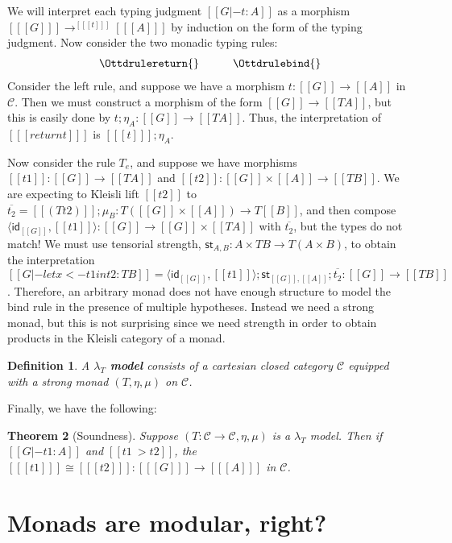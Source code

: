 \documentclass{article}
\let\mto\to
\let\to\relax
\newcommand{\to}{\rightarrow}
\newcommand{\cat}[1]{\mathcal{#1}}
\newcommand{\id}[0]{\mathsf{id}}
\newtheorem{theorem}{Theorem}
\newtheorem{definition}[theorem]{Definition}
\begin{document}
We will interpret each typing judgment $[[G |- t : A]]$ as a morphism
$[[ [G] ]] \mto^{[[ [t] ]]} [[ [A] ]]$ by induction on the form of the
typing judgment. Now consider the two monadic typing rules:
\[
\begin{array}{lll}
  \Ottdrulereturn{} & \quad & \Ottdrulebind{}
\end{array}
\]
Consider the left rule, and suppose we have a morphism $t : [[G]] \mto
[[A]]$ in $\cat{C}$.  Then we must construct a morphism of the form
$[[G]] \mto [[T A]]$, but this is easily done by $t;\eta_A : [[G]]
\mto [[T A]]$.  Thus, the interpretation of $[[ [return t] ]]$ is
$[[ [t] ]];\eta_A$.

Now consider the rule $T_e$, and suppose we have morphisms $[[t1]] :
[[G]] \mto [[T A]]$ and $[[t2]] : [[G]] \times [[A]] \mto [[T B]]$.
We are expecting to Kleisli lift $[[t2]]$ to $\overline{t_2} = [[(T
    t2)]];\mu_B : T ([[G]] \times [[A]]) \mto T [[B]]$, and then
compose $\langle \id_{[[G]]} , [[t1]] \rangle : [[G]] \mto [[G]]
\times [[T A]]$ with $\overline{t_2}$, but the types do not match!  We
must use tensorial strength, $\mathsf{st}_{A,B} : A \times T B \mto
T(A \times B)$, to obtain the interpretation $[[G |- let x <- t1 in t2
    : T B]] = \langle \id_{[[G]]} , [[t1]]
\rangle;\mathsf{st}_{[[G]],[[A]]};\overline{t_2} : [[G]] \mto [[T
    B]]$.  Therefore, an arbitrary monad does not have enough
structure to model the bind rule in the presence of multiple
hypotheses.  Instead we need a strong monad, but this is not
surprising since we need strength in order to obtain products in the
Kleisli category of a monad.

\begin{definition}
  \label{def:lambdaT-model}
  A \textbf{$\lambda_T$ model} consists of a cartesian closed category
  $\cat{C}$ equipped with a strong monad $(T,\eta,\mu)$ on $\cat{C}$.
\end{definition}
\noindent
Finally, we have the following:
\begin{theorem}[Soundness]
  \label{thm:soundness}
  Suppose $(T : \cat{C} \mto \cat{C},\eta,\mu)$ is a $\lambda_T$ model.  Then if $[[G |- t1 :
      A]]$ and $[[t1 ~> t2]]$, the $[[ [t1] ]] \cong [[ [t2] ]] : [[ [G] ]] \mto [[ [A] ]]$ in $\cat{C}$.
\end{theorem}


\section{Monads are modular, right?}
\label{sec:monads_are_modular,_right?}
\end{document}
